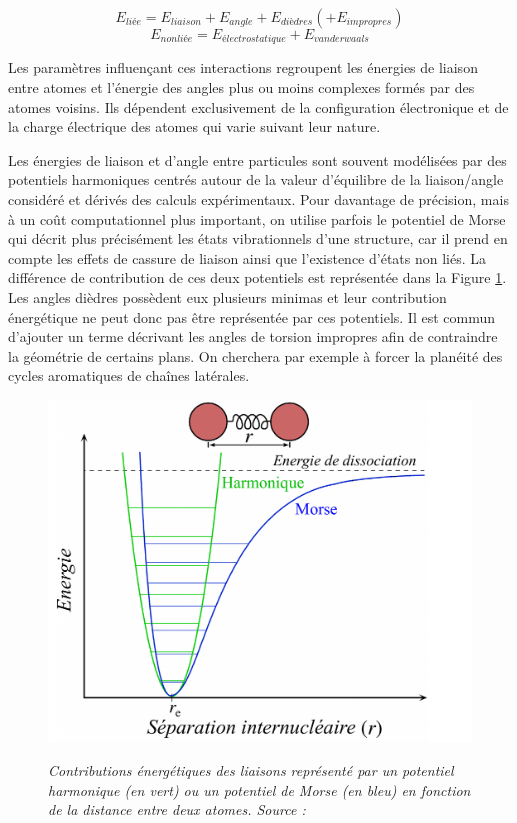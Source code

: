 $$E_{liée} = E_{liaison} + E_{angle} + E_{dièdres} (+ E_{impropres})$$
$$E_{nonliée} = E_{électrostatique} + E_{vanderwaals}$$

Les paramètres influençant ces interactions regroupent les énergies de liaison entre atomes et l'énergie des angles plus ou moins complexes formés par des atomes voisins. Ils dépendent exclusivement de la configuration électronique et de la charge électrique des atomes qui varie suivant leur nature.


Les énergies de liaison et d'angle entre particules sont souvent modélisées par des potentiels harmoniques centrés autour de la valeur d'équilibre de la liaison/angle considéré et dérivés des calculs expérimentaux. Pour davantage de précision, mais à un coût computationnel plus important, on utilise parfois le potentiel de Morse qui décrit plus précisément les états vibrationnels d'une structure, car il prend en compte les effets de cassure de liaison ainsi que l'existence d'états non liés. La différence de contribution de ces deux potentiels est représentée dans la Figure \ref{Fig:harmonic_morse_potential}. Les angles dièdres possèdent eux plusieurs minimas et leur contribution énergétique ne peut donc pas être représentée par ces potentiels. Il est commun d'ajouter un terme décrivant les angles de torsion impropres afin de contraindre la géométrie de certains plans. On cherchera par exemple à forcer la planéité des cycles aromatiques de chaînes latérales.

\begin{figure}
  \centering
  {\includegraphics[width=0.75\linewidth]{./figures/ch1/harmonic_vs_morse_potential.pdf}}
    \caption[Contributions énergétiques des liaisons covalentes.]{\it Contributions énergétiques des liaisons représenté par un potentiel harmonique (en vert) ou un potentiel de Morse (en bleu) en fonction de la distance entre deux atomes. Source : \cite{assumed_graphical_2006}}
    \label{Fig:harmonic_morse_potential}
  \hspace{0.2cm}
\end{figure}

